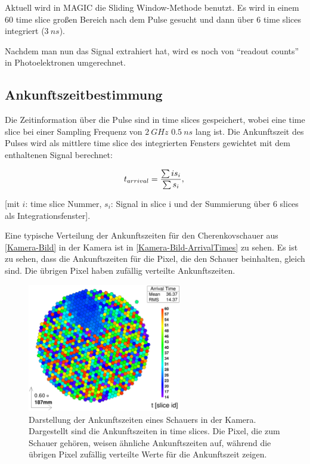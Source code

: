 Aktuell wird in MAGIC die Sliding Window-Methode benutzt. Es wird in einem 60 time slice großen Bereich nach dem Pulse gesucht und dann über 6 time slices integriert ($\SI{3}{ns}$).

Nachdem man nun das Signal extrahiert hat, wird es noch von ``readout counts'' in Photoelektronen umgerechnet.

\subsection{Ankunftszeitbestimmung}
Die Zeitinformation über die Pulse sind in time slices gespeichert, wobei eine time slice bei einer Sampling Frequenz von $\SI{2}{GHz}$ $\SI{0,5}{ns}$ lang ist.
Die Ankunftszeit des Pulses wird als mittlere time slice des integrierten Fensters gewichtet mit dem enthaltenen Signal berechnet:

\begin{equation}
 t_{arrival}=\frac{\sum i s_i}{\sum s_i},\\
\end{equation}
\begin{center}
\small{[mit $i$: time slice Nummer, $s_i$: Signal in slice i und der Summierung über 6 slices als Integrationsfenster].}
\end{center}


Eine typische Verteilung der Ankunftszeiten für den Cherenkovschauer aus \autoref{Kamera-Bild} in der Kamera ist in \autoref{Kamera-Bild-ArrivalTimes} zu sehen.
Es ist zu sehen, dass die Ankunftszeiten für die Pixel, die den Schauer beinhalten, gleich sind.
Die übrigen Pixel haben zufällig verteilte Ankunftszeiten.

\begin{figure}
    \centering
    \includegraphics[width=0.6\textwidth]{./Plots/03_MonteCarlos/Signal_ArrivalTime_fertig.png}
    \caption{Darstellung der Ankunftszeiten eines Schauers in der Kamera. Dargestellt sind die Ankunftszeiten in time slices.
    Die Pixel, die zum Schauer gehören, weisen ähnliche Ankunftszeiten auf, während die übrigen Pixel zufällig verteilte Werte für die Ankunftszeit zeigen.}
    \label{Kamera-Bild-ArrivalTimes}
\end{figure}

